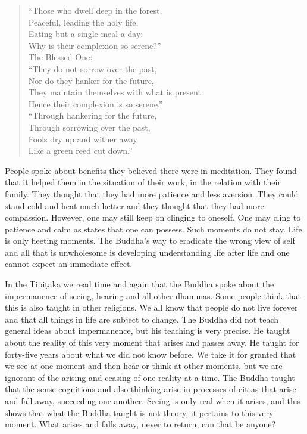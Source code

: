 \begin{verse}
``Those who dwell deep in the forest,\\

Peaceful, leading the holy life,\\

Eating but a single meal a day:\\

Why is their complexion so serene?''\\

The Blessed One:\\

``They do not sorrow over the past,\\

Nor do they hanker for the future,\\

They maintain themselves with what is present:\\

Hence their complexion is so serene.''\\

``Through hankering for the future,\\

Through sorrowing over the past,\\

Fools dry up and wither away\\

Like a green reed cut down.''\\
\end{verse}

People spoke about benefits they believed there were in meditation. They
found that it helped them in the situation of their work, in the
relation with their family. They thought that they had more patience and
less aversion. They could stand cold and heat much better and they
thought that they had more compassion. However, one may still keep on
clinging to oneself. One may cling to patience and calm as states that
one can possess. Such moments do not stay. Life is only fleeting
moments. The Buddha's way to eradicate the wrong view of self and all
that is unwholesome is developing understanding life after life and one
cannot expect an immediate effect.

In the Tipiṭaka we read time and again that the Buddha spoke about the
impermanence of seeing, hearing and all other dhammas. Some people
think that this is also taught in other religions. We all know that
people do not live forever and that all things in life are subject to
change. The Buddha did not teach general ideas about impermanence, but
his teaching is very precise. He taught about the reality of this very
moment that arises and passes away. He taught for forty-five years about
what we did not know before. We take it for granted that we see at one
moment and then hear or think at other moments, but we are ignorant of
the arising and ceasing of one reality at a time. The Buddha taught that
the sense-cognitions and also thinking arise in processes of cittas that
arise and fall away, succeeding one another. Seeing is only real when it
arises, and this shows that what the Buddha taught is not theory, it
pertains to this very moment. What arises and falls away, never to
return, can that be anyone?

